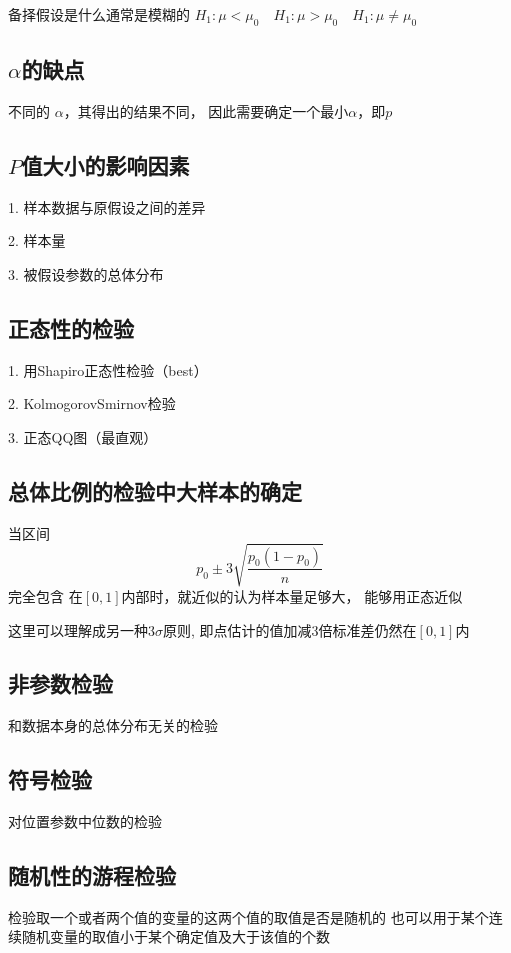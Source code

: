 \documentclass[UTF8,10pt]{book}
\begin{document}
{        备择假设是什么通常是模糊的 $H_1: \mu < \mu_0 \quad H_1: \mu > \mu_0 \quad H_1: \mu \neq \mu_0 $

        \subsection{$ \alpha $的缺点}	

        不同的 $\alpha$，其得出的结果不同， 因此需要确定一个最小$\alpha$，即$p$

        \subsection{$P$值大小的影响因素}	
        1. 样本数据与原假设之间的差异 

        2. 样本量 

        3. 被假设参数的总体分布

        \subsection{正态性的检验}	
        1. 用Shapiro正态性检验（best） 

        2. KolmogorovSmirnov检验 

        3. 正态QQ图（最直观）

        \subsection{总体比例的检验中大样本的确定}	
        当区间 $$ p_0 \pm 3 \sqrt{\frac{p_0(1-p_0)}{n}} $$ 完全包含
        在$[0,1]$内部时，就近似的认为样本量足够大，
        能够用正态近似 
        
        这里可以理解成另一种$3\sigma$原则,
        即点估计的值加减3倍标准差仍然在$[0,1]$内
        
        \subsection{非参数检验}	
        
        和数据本身的总体分布无关的检验
        
        \subsection{符号检验}	
        对位置参数中位数的检验

        \subsection{随机性的游程检验}	
        检验取一个或者两个值的变量的这两个值的取值是否是随机的 
        也可以用于某个连续随机变量的取值小于某个确定值及大于该值的个数
        
}
\end{document}
